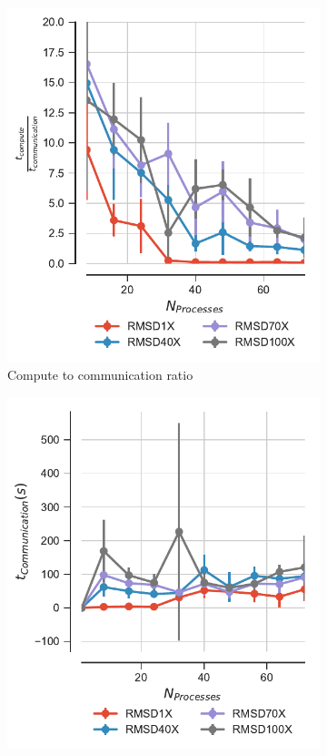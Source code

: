 \begin{figure}[ht!]
\centering
\begin{subfigure}{.4\textwidth}
  \includegraphics[width=\linewidth]{figures/Compute_to_comm_ratio_on_performance_v17.pdf}
  \captionsetup{format=hang}
\caption{Compute to communication ratio}
\label{fig:tcomp_tcomm_ratio}
\end{subfigure}
\hfill
\begin{subfigure}{.4\textwidth}
  \includegraphics[width=\linewidth]{figures/comm_comparison_different_RMSD_overload.pdf}

\end{subfigure}
\end{figure}
